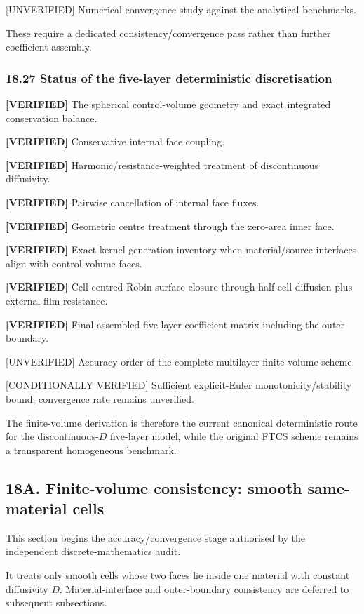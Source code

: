 \documentclass[11pt,a4paper]{article}
\begin{document}
[UNVERIFIED] Numerical convergence study against the analytical benchmarks.

These require a dedicated consistency/convergence pass rather than further coefficient assembly.

\subsubsection*{18.27 Status of the five-layer deterministic discretisation}

\textbf{[VERIFIED]} The spherical control-volume geometry and exact integrated conservation balance.

\textbf{[VERIFIED]} Conservative internal face coupling.

\textbf{[VERIFIED]} Harmonic/resistance-weighted treatment of discontinuous diffusivity.

\textbf{[VERIFIED]} Pairwise cancellation of internal face fluxes.

\textbf{[VERIFIED]} Geometric centre treatment through the zero-area inner face.

\textbf{[VERIFIED]} Exact kernel generation inventory when material/source interfaces align with control-volume faces.

\textbf{[VERIFIED]} Cell-centred Robin surface closure through half-cell diffusion plus external-film resistance.

\textbf{[VERIFIED]} Final assembled five-layer coefficient matrix including the outer boundary.

[UNVERIFIED] Accuracy order of the complete multilayer finite-volume scheme.

[CONDITIONALLY VERIFIED] Sufficient explicit-Euler monotonicity/stability bound; convergence rate remains unverified.

The finite-volume derivation is therefore the current canonical deterministic route for the discontinuous-$D$ five-layer model, while the original FTCS scheme remains a transparent homogeneous benchmark.

\subsection*{18A. Finite-volume consistency: smooth same-material cells}

This section begins the accuracy/convergence stage authorised by the independent discrete-mathematics audit.

It treats only smooth cells whose two faces lie inside one material with constant diffusivity $D$. Material-interface and outer-boundary consistency are deferred to subsequent subsections.
\end{document}
